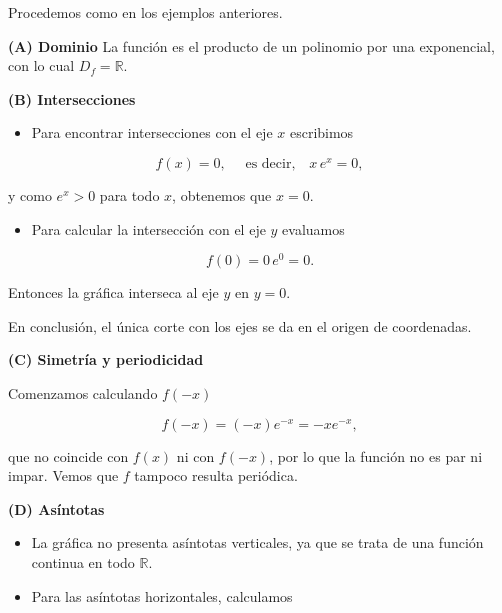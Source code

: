 \documentclass[
  letterpaper,
]{book}
\providecommand{\tightlist}{%
  \setlength{\itemsep}{0pt}\setlength{\parskip}{0pt}}
\theoremstyle{plain}
\theoremstyle{remark}
\begin{document}
\begin{tcolorbox}[enhanced jigsaw, opacityback=0, left=2mm, opacitybacktitle=0.6, toprule=.15mm, bottomrule=.15mm, colbacktitle=quarto-callout-tip-color!10!white, titlerule=0mm, bottomtitle=1mm, title=\textcolor{quarto-callout-tip-color}{\faLightbulb}\hspace{0.5em}{Solución}, toptitle=1mm, colframe=quarto-callout-tip-color-frame, colback=white, breakable, rightrule=.15mm, arc=.35mm, leftrule=.75mm, coltitle=black]

Procedemos como en los ejemplos anteriores.

\textbf{(A) Dominio} La función es el producto de un polinomio por una
exponencial, con lo cual \(D_f=\mathbb{R}\).

\textbf{(B) Intersecciones}

\begin{itemize}
\tightlist
\item
  Para encontrar intersecciones con el eje \(x\) escribimos
\end{itemize}

\[
f(x)=0, \quad \text{ es decir,} \quad x\,e^x=0,
\]

y como \(e^x>0\) para todo \(x\), obtenemos que \(x=0\).

\begin{itemize}
\tightlist
\item
  Para calcular la intersección con el eje \(y\) evaluamos
\end{itemize}

\[
f(0)=0\,e^0=0.
\]

Entonces la gráfica interseca al eje \(y\) en \(y=0\).

En conclusión, el única corte con los ejes se da en el origen de
coordenadas.

\textbf{(C) Simetría y periodicidad}

Comenzamos calculando \(f(-x)\)

\[
f(-x)=(-x)e^{-x}=-xe^{-x},
\]

que no coincide con \(f(x)\) ni con \(f(-x)\), por lo que la función no
es par ni impar. Vemos que \(f\) tampoco resulta periódica.

\textbf{(D) Asíntotas}

\begin{itemize}
\item
  La gráfica no presenta asíntotas verticales, ya que se trata de una
  función continua en todo \(\mathbb{R}\).
\item
  Para las asíntotas horizontales, calculamos
\end{itemize}


\end{tcolorbox}
\end{document}
